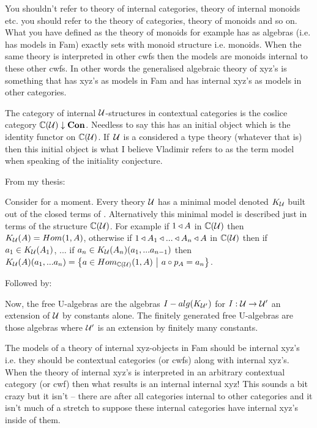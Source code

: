 \begin{notebox}
You  shouldn't refer to theory of internal categories, theory of internal monoids etc. you should refer to the
theory of categories, theory of monoids and so on. What you have defined as the theory of monoids for example has
as algebras (i.e. has models in Fam) exactly sets with monoid structure i.e. monoids. When the same theory is interpreted in other cwfs then
the models are monoids internal to these other cwfs. In other words the generalised algebraic theory of xyz's is something that has xyz's as models in Fam and has internal xyz's as models in other categories. 
\end{notebox}

\note The category of internal $\gat[U]$-structures in contextual categories is the coslice category
$\CofU \downarrow \catCon$. Needless to say this has an initial object which is the identity functor on  $\CofU$.
If\ $\gat[U]$ is a considered a type theory (whatever that is) then this initial object is what I believe Vladimir refers
to as the term model when speaking of the initiality conjecture.



\note From my thesis:
\begin{tightquote}
Consider for a moment. Every theory $\gat[U]$ has a minimal model denoted $\KU$ built out of the closed terms of \gat[U]. Alternatively this minimal model is described just in terms of the structure $\CofU$. For example
if $1 \base A$ in $\CofU$ then 
$\KU(A)=Hom(1,A)$, otherwise if $1 \base A_1 \base ... \base A_n \base A$ in $\CofU$
then if $a_1 \in \KU(A_1)$, ... if $a_n \in \KU(A_n)(a_1,...a_{n-1})$ then 
$\KU(A)(a_1,...a_n)=\setsuchthat{a\in Hom_{\CofU}(1,A)}{a \circ p_A = a_n}$. \\
\end{tightquote} 

Followed by:
\begin{tightquote}
Now, the free U-algebras are the algebras $I-alg(\KUp)$ for $I: \gat[U] \morph \gat[U']$ an extension of $\gat[U]$ by constants alone. The finitely generated free U-algebras are those algebras where $\gat[U']$ is an extension by finitely many constants. \\
\end{tightquote}


\note
The models of a theory of internal xyz-objects  in Fam should be  internal xyz's i.e. they should be contextual categories (or cwfs) along with internal xyz's. When the theory of internal xyz's is interpreted in an arbitrary contextual category (or cwf) then what results is an internal internal xyz! This sounds a bit crazy but it isn't -- there are after all categories internal to other categories and it isn't much of a stretch to suppose these internal categories have internal xyz's inside of them. 

